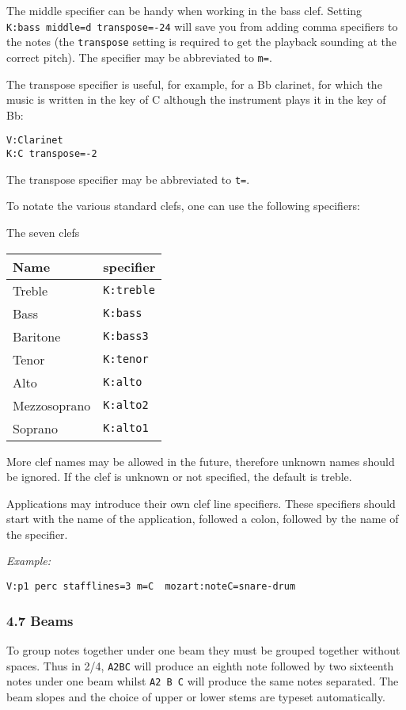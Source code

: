 The middle specifier can be handy when working in the bass clef. Setting
\texttt{K:bass\ middle=d\ transpose=-24} will save you from adding comma
specifiers to the notes (the \texttt{transpose} setting is required to
get the playback sounding at the correct pitch). The specifier may be
abbreviated to \texttt{m=}.

The transpose specifier is useful, for example, for a Bb clarinet, for
which the music is written in the key of C although the instrument plays
it in the key of Bb:

\begin{verbatim}
V:Clarinet
K:C transpose=-2
\end{verbatim}

The transpose specifier may be abbreviated to \texttt{t=}.

To notate the various standard clefs, one can use the following
specifiers:

The seven clefs

\begin{longtable}[]{@{}ll@{}}
\toprule
Name & specifier\tabularnewline
\midrule
\endhead
Treble & \texttt{K:treble}\tabularnewline
Bass & \texttt{K:bass}\tabularnewline
Baritone & \texttt{K:bass3}\tabularnewline
Tenor & \texttt{K:tenor}\tabularnewline
Alto & \texttt{K:alto}\tabularnewline
Mezzosoprano & \texttt{K:alto2}\tabularnewline
Soprano & \texttt{K:alto1}\tabularnewline
\bottomrule
\end{longtable}

More clef names may be allowed in the future, therefore unknown names
should be ignored. If the clef is unknown or not specified, the default
is treble.

Applications may introduce their own clef line specifiers. These
specifiers should start with the name of the application, followed a
colon, followed by the name of the specifier.

\emph{Example:}

\begin{verbatim}
V:p1 perc stafflines=3 m=C  mozart:noteC=snare-drum
\end{verbatim}

\hypertarget{beams}{\subsubsection{4.7 Beams}\label{beams}}

To group notes together under one beam they must be grouped together
without spaces. Thus in 2/4, \texttt{A2BC} will produce an eighth note
followed by two sixteenth notes under one beam whilst \texttt{A2\ B\ C}
will produce the same notes separated. The beam slopes and the choice of
upper or lower stems are typeset automatically.

